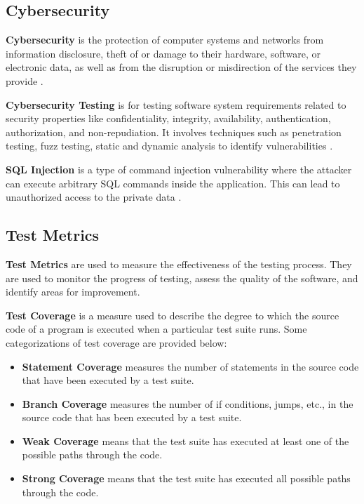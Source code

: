 \subsection{Cybersecurity}\label{subsec:cybersecurity}

\textbf{Cybersecurity} is the protection of computer systems and networks from information disclosure, theft of or damage to their hardware, software, or electronic data, as well as from the disruption or misdirection of the services they provide \cite{FELDERER20161}.

\textbf{Cybersecurity Testing} is for testing software system requirements related to security properties like confidentiality, integrity, availability, authentication, authorization, and non-repudiation.
It involves techniques such as penetration testing, fuzz testing, static and dynamic analysis to identify vulnerabilities \cite{FELDERER20161}.

\textbf{SQL Injection} is a type of command injection vulnerability where the attacker can execute arbitrary SQL commands inside the application.
This can lead to unauthorized access to the private data \cite{SQLInjection}.

\subsection{Test Metrics}\label{subsec:test-metrics}

\textbf{Test Metrics} are used to measure the effectiveness of the testing process.
They are used to monitor the progress of testing, assess the quality of the software, and identify areas for improvement.

\textbf{Test Coverage} is a measure used to describe the degree to which the source code of a program is executed when a particular test suite runs.
Some categorizations of test coverage are provided below:

\begin{itemize}
    \item \textbf{Statement Coverage} measures the number of statements in the source code that have been executed by a test suite.
    \item \textbf{Branch Coverage} measures the number of if conditions, jumps, etc., in the source code that has been executed by a test suite.
    \item \textbf{Weak Coverage} means that the test suite has executed at least one of the possible paths through the code.
    \item \textbf{Strong Coverage} means that the test suite has executed all possible paths through the code.
\end{itemize}


